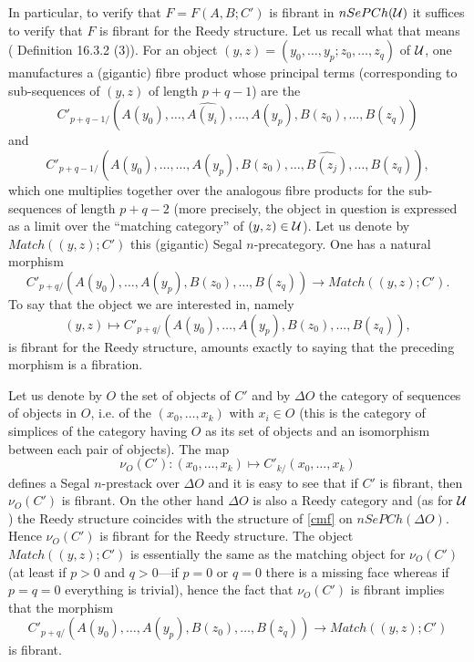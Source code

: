 In particular, to verify that $F=F(A,B; C')$ is fibrant
in $nSePCh({\cal U} )$
it suffices to verify that $F$ is fibrant for the Reedy structure.
Let us recall what that means (\cite{Hirschhorn} Definition 16.3.2 (3)).
For an object $(y,z)= (y_0,\ldots , y_p; z_0,\ldots , z_q)$ of ${\cal U}$,
one manufactures a (gigantic) fibre product whose principal terms
(corresponding to sub-sequences of $(y,z)$ of length $p+q-1$)
are the
$$
C'_{p+q-1/}(A(y_0),\ldots , \widehat{A(y_i)},\ldots , A(y_p),
B(z_0),\ldots , B(z_q))
$$
and
$$
C'_{p+q-1/}(A(y_0),\ldots , \ldots , A(y_p),
B(z_0),\ldots ,\widehat{B(z_j)},\ldots , B(z_q)),
$$
which one multiplies together
over the analogous fibre products for the
sub-sequences of length $p+q-2$ (more precisely, the object in question
is expressed as a limit over the ``matching
category'' of $(y,z)\in {\cal U} $). Let us denote by $Match((y,z); C')$
this (gigantic) Segal $n$-precategory. One has a natural morphism
$$
C'_{p+q/}(A(y_0),\ldots ,  A(y_p),
B(z_0),\ldots , B(z_q))\rightarrow
Match ((y,z); C').
$$
To say that the object we are interested in, namely
$$
(y,z)\mapsto C'_{p+q/}(A(y_0),\ldots ,  A(y_p),
B(z_0),\ldots , B(z_q)),
$$
is fibrant for the Reedy structure,
amounts exactly to saying that the
preceding morphism is a fibration.

Let us denote by $O$ the set
of objects of $C'$ and by $\Delta O$ the category of sequences of objects in
$O$, i.e.
of the $(x_0,\ldots , x_k)$ with $x_i\in O$ (this is the category of simplices
of the category having $O$
as its set of objects and an isomorphism between each pair of objects).
The map $$
\nu _O(C'): (x_0,\ldots , x_k)\mapsto C'_{k/}(x_0,\ldots , x_k)
$$
defines a Segal $n$-prestack over $\Delta O$ and it is easy to
see that if $C'$ is fibrant, then $\nu _O(C')$ is fibrant.
On the other hand $\Delta O$ is also a Reedy category and (as for ${\cal U}$)
the Reedy structure coincides with the structure of \ref{cmf} on
$nSePCh(\Delta O)$. Hence $\nu _O(C')$ is fibrant for the Reedy structure.
The object $Match ((y,z); C')$ is essentially the same
as the matching object for $\nu _O(C')$
(at least if $p>0$ and
$q>0$---if $p=0$ or $q=0$ there is a missing face whereas if $p=q=0$ everything
is trivial), hence the fact that $\nu
_O(C')$ is fibrant implies that the morphism
$$
C'_{p+q/}(A(y_0),\ldots ,  A(y_p),
B(z_0),\ldots , B(z_q))\rightarrow
Match ((y,z); C')
$$
is fibrant.

